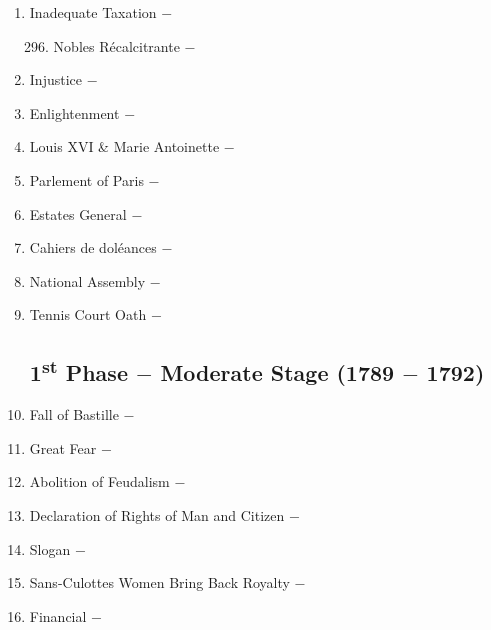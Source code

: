 \documentclass[12pt]{article}
\begin{document}
\begin{enumerate}
\begin{enumerate}[label=\arabic{*}.]
\end{enumerate}
\setcounter{enumi}{294}

\item Inadequate Taxation $-$ 

\begin{enumerate}[label=\arabic{*}.]
\setcounter{enumii}{295}

\item Nobles R\'ecalcitrante $-$

\end{enumerate}
\setcounter{enumi}{296}

\item Injustice $-$

\item Enlightenment $-$ 

\item Louis XVI \& Marie Antoinette $-$

\item Parlement of Paris $-$ 

\item Estates General $-$ 

\item Cahiers de dol\'eances $-$

\item National Assembly $-$

\item Tennis Court Oath $-$ 

\subsection{1\textsuperscript{st} Phase $-$ Moderate Stage (1789 $-$ 1792)}

\item Fall of Bastille $-$ 

\item Great Fear $-$ 

\item Abolition of Feudalism $-$ 

\item Declaration of Rights of Man and Citizen $-$ 

\item Slogan $-$ 

\item Sans-Culottes Women Bring Back Royalty $-$ 

\item Financial $-$ 

\begin{enumerate}[label=\arabic{*}.]
\setcounter{enumii}{311}


\end{enumerate}
\end{enumerate}
\end{document}
